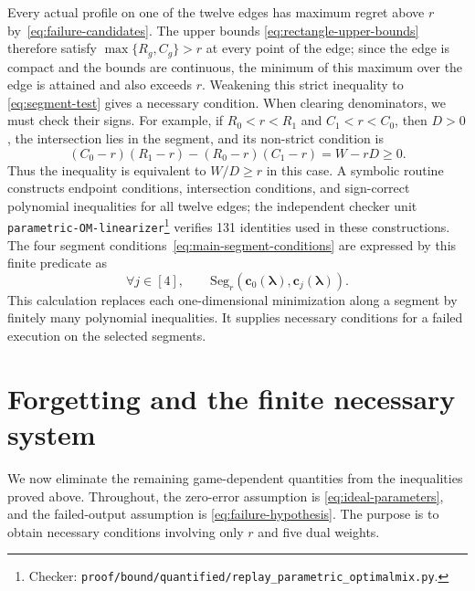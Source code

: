 \documentclass[11pt]{article}
\theoremstyle{remark}
\theoremstyle{plain}
\begin{document}
Every actual profile on one of the twelve edges has maximum regret
above $r$ by~\eqref{eq:failure-candidates}. The upper bounds
\eqref{eq:rectangle-upper-bounds} therefore satisfy
$\max\{R_g,C_g\}>r$ at every point of the edge; since the edge is
compact and the bounds are continuous, the minimum of this maximum
over the edge is attained and also exceeds $r$. Weakening this
strict inequality to
\eqref{eq:segment-test} gives a necessary condition.
When clearing denominators, we must check their signs.
For example, if $R_0<r<R_1$ and $C_1<r<C_0$, then $D>0$,
the intersection lies in the segment, and its non-strict condition is
\begin{equation}
 (C_0-r)(R_1-r)-(R_0-r)(C_1-r)=W-rD\ge0.
 \label{eq:app-positive-denominator-intersection-test}
\end{equation}
Thus the inequality is equivalent to $W/D\ge r$ in this case.
A symbolic routine constructs endpoint conditions, intersection
conditions, and sign-correct polynomial inequalities for all
twelve edges; the independent checker unit
\nolinkurl{parametric-OM-linearizer}\footnote{Checker:
\nolinkurl{proof/bound/quantified/replay_parametric_optimalmix.py}.\label{fn:checker-parametric-OM-linearizer}} verifies 131 identities
used in these constructions.
The four segment conditions~\eqref{eq:main-segment-conditions}
are expressed by this finite predicate as
\begin{equation}
 \forall j\in[4],\qquad
 \mathrm{Seg}_r(\boldsymbol c_0(\boldsymbol\lambda),\boldsymbol c_j(\boldsymbol\lambda)).
 \label{eq:app-four-segment-comparisons}
\end{equation}
This calculation replaces each one-dimensional minimization along a
segment by finitely many polynomial inequalities. It supplies
necessary conditions for a failed execution on the selected segments.

\section{Forgetting and the finite necessary system}
\label{app:scalar}

We now eliminate the remaining game-dependent quantities from the
inequalities proved above. Throughout, the zero-error assumption is
\eqref{eq:ideal-parameters}, and the failed-output assumption is
\eqref{eq:failure-hypothesis}. The purpose is to obtain necessary
conditions involving only $r$ and five dual weights.
\end{document}
